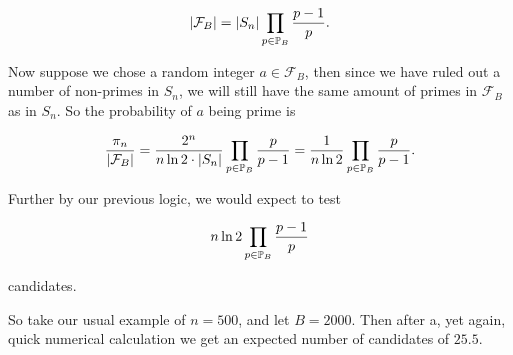   \begin{equation}
    \left| \mathcal{F}_B \right| = \left|  S_n  \right| \prod_{p\in \mathbb{P}_B} \frac{p-1}{p}.
    \label{eq:order-after-filtration}
  \end{equation}

  Now suppose we chose a random integer $a \in \mathcal{F}_B$, then since we have ruled out a number of non-primes in $S_n$, we will still have the same amount of primes in $\mathcal{F}_B$ as in $S_n$.
  So the probability of $a$ being prime is

  \begin{equation}
    \frac{\pi_n}{\left| \mathcal{F}_B \right|} = \frac{2^n}{n\ln 2 \cdot \left| S_n \right|} \prod_{p \in \mathbb{P}_B} \frac{p}{p-1}
    = \frac{1}{n \ln 2} \prod_{p \in \mathbb{P}_B} \frac{p}{p-1}.
    \label{eq:probability-of-prime-in-fb}
  \end{equation}

  Further by our previous logic, we would expect to test

  \begin{equation}
    n \ln 2 \prod_{p \in \mathbb{P}_B} \frac{p-1}{p}
    \label{eq:candidates-teste-with-filtration}
  \end{equation}
  
  candidates.

  So take our usual example of $n = 500$, and let $B = 2000$.
  Then after a, yet again, quick numerical calculation we get an expected number of candidates of $25.5$.
